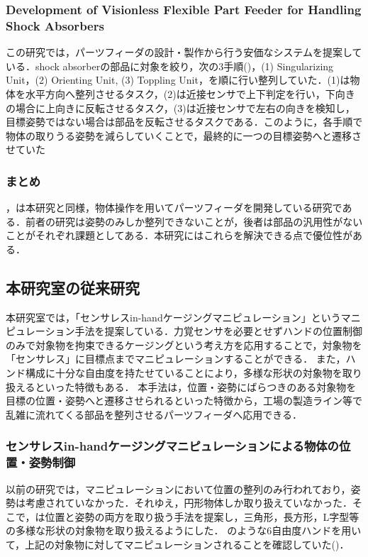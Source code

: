 \documentclass[a4paper,twoside,12pt,papersize, dvipdfmx]{iirthesis}
\begin{document}
\subsubsection{Development of Visionless Flexible Part Feeder for Handling Shock Absorbers \cite{udhayakumar2021}}
この研究では，パーツフィーダの設計・製作から行う安価なシステムを提案している．shock absorberの部品に対象を絞り，次の3手順()，(1) Singularizing Unit，(2) Orienting Unit, (3) Toppling Unit，を順に行い整列していた．(1)は物体を水平方向へ整列させるタスク，(2)は近接センサで上下判定を行い，下向きの場合に上向きに反転させるタスク，(3)は近接センサで左右の向きを検知し，目標姿勢ではない場合は部品を反転させるタスクである．このように，各手順で物体の取りうる姿勢を減らしていくことで，最終的に一つの目標姿勢へと遷移させていた

\subsubsection{まとめ}
\cite{akella2000}，\cite{udhayakumar2021}は本研究と同様，物体操作を用いてパーツフィーダを開発している研究である．前者の研究は姿勢のみしか整列できないことが，後者は部品の汎用性がないことがそれぞれ課題としてある．本研究にはこれらを解決できる点で優位性がある．

\subsection{本研究室の従来研究}
本研究室では，「センサレスin-handケージングマニピュレーション」というマニピュレーション手法を提案している．力覚センサを必要とせずハンドの位置制御のみで対象物を拘束できるケージングという考え方を応用することで，対象物を「センサレス」に目標点までマニピュレーションすることができる．
また，ハンド構成に十分な自由度を持たせていることにより，多様な形状の対象物を取り扱えるといった特徴もある．
本手法は，位置・姿勢にばらつきのある対象物を目標の位置・姿勢へと遷移させられるといった特徴から，工場の製造ライン等で乱雑に流れてくる部品を整列させるパーツフィーダへ応用できる．

\subsubsection{センサレスin-handケージングマニピュレーションによる物体の位置・姿勢制御 \cite{komiyama2021}}
以前の研究\cite{asamura2013}では，マニピュレーションにおいて位置の整列のみ行われており，姿勢は考慮されていなかった．それゆえ，円形物体しか取り扱えていなかった．そこで，\cite{komiyama2021}は位置と姿勢の両方を取り扱う手法を提案し，三角形，長方形，L字型等の多様な形状の対象物を取り扱えるようにした．
\figref{}のような6自由度ハンドを用いて，上記の対象物に対してマニピュレーションされることを確認していた(\figref{})．
\end{document}
